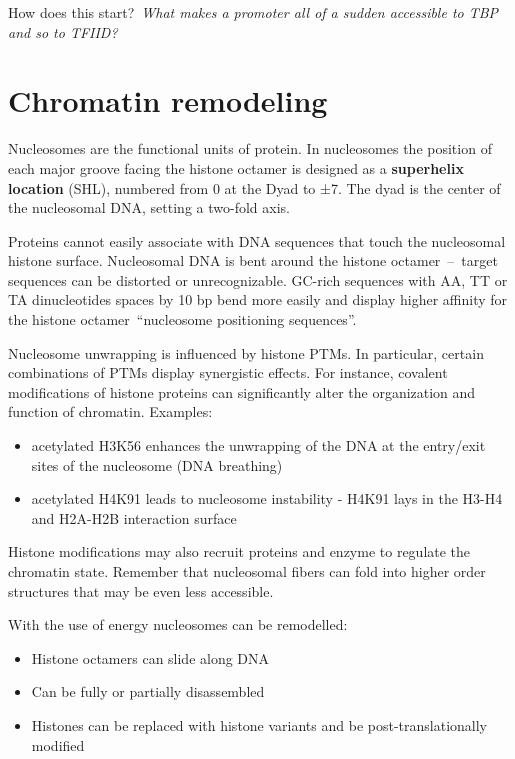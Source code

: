 How does this start?~\emph{What makes a promoter all of a sudden accessible to TBP and so to TFIID?}~

\hypertarget{chromatin-remodeling}{%
\section{Chromatin remodeling}\label{chromatin-remodeling}}

Nucleosomes are the functional units of protein. In nucleosomes the position of each major groove facing the histone octamer is designed as a \textbf{superhelix location} (SHL), numbered from 0 at the Dyad to ±7. The dyad is the center of the nucleosomal DNA, setting a two-fold axis.

Proteins cannot easily associate with DNA sequences that touch the nucleosomal histone surface. Nucleosomal DNA is bent around the histone octamer~--~target sequences can be distorted or unrecognizable. GC-rich sequences with AA, TT or TA dinucleotides spaces by 10 bp bend more easily and display higher affinity for the histone octamer~``nucleosome positioning sequences''.

Nucleosome unwrapping is influenced by histone PTMs. In particular, certain combinations of PTMs display synergistic effects. For instance, covalent modifications of histone proteins can significantly alter the organization and function of chromatin. Examples:

\begin{itemize}
\tightlist
\item
  acetylated H3K56 enhances the unwrapping of the DNA at the entry/exit sites of the nucleosome (DNA breathing)
\item
  acetylated H4K91 leads to nucleosome instability - H4K91 lays in the H3-H4 and H2A-H2B interaction surface
\end{itemize}

Histone modifications may also recruit proteins and enzyme to regulate the chromatin state. Remember that nucleosomal fibers can fold into higher order structures that may be even less accessible.

With the use of energy nucleosomes can be remodelled:
\begin{itemize}
\tightlist
\item
Histone octamers can slide along DNA
\item
Can be fully or partially disassembled
\item
Histones can be replaced with histone variants and be post-translationally modified
\end{itemize}

